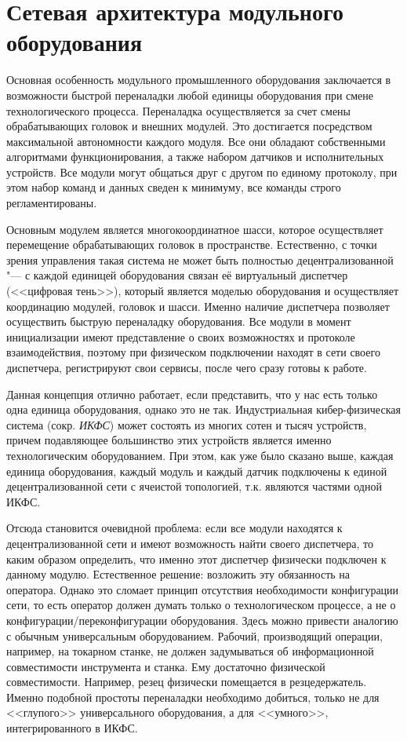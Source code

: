 \section{Сетевая архитектура модульного оборудования}\label{sec:ch3/sec2}

Основная особенность модульного промышленного оборудования заключается в возможности быстрой переналадки любой единицы оборудования при смене технологического процесса. Переналадка осуществляется за счет смены обрабатывающих головок и внешних модулей.  Это достигается посредством максимальной автономности каждого модуля. Все они обладают собственными алгоритмами функционирования, а также набором датчиков и исполнительных устройств. Все модули могут общаться друг с другом по единому протоколу, при этом набор команд и данных сведен к минимуму, все команды строго регламентированы.

Основным модулем является многокоординатное шасси, которое осуществляет перемещение обрабатывающих головок в пространстве. Естественно, с точки зрения управления такая система не может быть полностью децентрализованной "--- с каждой единицей оборудования связан её виртуальный диспетчер (<<цифровая тень>>), который является моделью оборудования и осуществляет координацию модулей, головок и шасси. Именно наличие диспетчера позволяет осуществить быструю переналадку оборудования. Все модули в момент инициализации имеют представление о своих возможностях и протоколе взаимодействия, поэтому при физическом подключении находят в сети своего диспетчера, регистрируют свои сервисы, после чего сразу готовы к работе.

Данная концепция отлично работает, если представить, что у нас есть только одна единица оборудования, однако это не так. Индустриальная кибер-физическая система (сокр. \textit{ИКФС}) может состоять из многих сотен и тысяч устройств, причем подавляющее большинство этих устройств является именно технологическим оборудованием. При этом, как уже было сказано выше, каждая единица оборудования, каждый модуль и каждый датчик подключены к единой децентрализованной сети с ячеистой топологией, т.\:к. являются частями одной ИКФС.

Отсюда становится очевидной проблема: если все модули находятся к децентрализованной сети и имеют возможность найти своего диспетчера, то каким образом определить, что именно этот диспетчер физически подключен к данному модулю. Естественное решение: возложить эту обязанность на оператора. Однако это сломает принцип отсутствия необходимости конфигурации сети, то есть оператор должен думать только о технологическом процессе, а не о конфигурации/переконфигурации оборудования. Здесь можно привести аналогию с обычным универсальным оборудованием. Рабочий, производящий операции, например, на токарном станке, не должен задумываться об информационной совместимости инструмента и станка. Ему достаточно физической совместимости. Например, резец физически помещается в резцедержатель. Именно подобной простоты переналадки необходимо добиться, только не для <<глупого>> универсального оборудования, а для <<умного>>, интегрированного в ИКФС.


